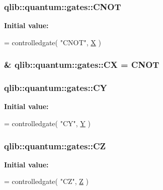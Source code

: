 \subsubsection[{\texorpdfstring{C\+N\+OT}{CNOT}}]{ qlib\+::quantum\+::gates\+::\+C\+N\+OT}\hypertarget{namespaceqlib_1_1quantum_1_1gates_aebaea8ead9b15e75666143e3fa30b9d4}{}\label{namespaceqlib_1_1quantum_1_1gates_aebaea8ead9b15e75666143e3fa30b9d4}
{\bfseries Initial value\+:}
\begin{DoxyCode}
= controlledgate(
    \textcolor{stringliteral}{"CNOT"}, 
    \hyperlink{namespaceqlib_1_1quantum_1_1gates_af56c4617497a46f091c27f7f4bc65ed5}{X}
    )
\end{DoxyCode}
\subsubsection[{\texorpdfstring{CX}{CX}}]{\& qlib\+::quantum\+::gates\+::\+CX = {\bf C\+N\+OT}}\hypertarget{namespaceqlib_1_1quantum_1_1gates_a932ac3dc30dfbfc065ef01b99b9f0ae1}{}\label{namespaceqlib_1_1quantum_1_1gates_a932ac3dc30dfbfc065ef01b99b9f0ae1}
\subsubsection[{\texorpdfstring{CY}{CY}}]{ qlib\+::quantum\+::gates\+::\+CY}\hypertarget{namespaceqlib_1_1quantum_1_1gates_afb32e9584e5434c3bff9087fe762ca9e}{}\label{namespaceqlib_1_1quantum_1_1gates_afb32e9584e5434c3bff9087fe762ca9e}
{\bfseries Initial value\+:}
\begin{DoxyCode}
= controlledgate(
    \textcolor{stringliteral}{"CY"}, 
    \hyperlink{namespaceqlib_1_1quantum_1_1gates_a7d495b8ebaa4b3a3f73a871bc993e82b}{Y}
    )
\end{DoxyCode}
\subsubsection[{\texorpdfstring{CZ}{CZ}}]{ qlib\+::quantum\+::gates\+::\+CZ}\hypertarget{namespaceqlib_1_1quantum_1_1gates_adaffb7ef8207f26d42d8756b38a61fe8}{}\label{namespaceqlib_1_1quantum_1_1gates_adaffb7ef8207f26d42d8756b38a61fe8}
{\bfseries Initial value\+:}
\begin{DoxyCode}
= controlledgate(
    \textcolor{stringliteral}{"CZ"}, 
    \hyperlink{namespaceqlib_1_1quantum_1_1gates_ad07d8c867d0463c3f66dfa80d5b6b53c}{Z}
    )
\end{DoxyCode}
